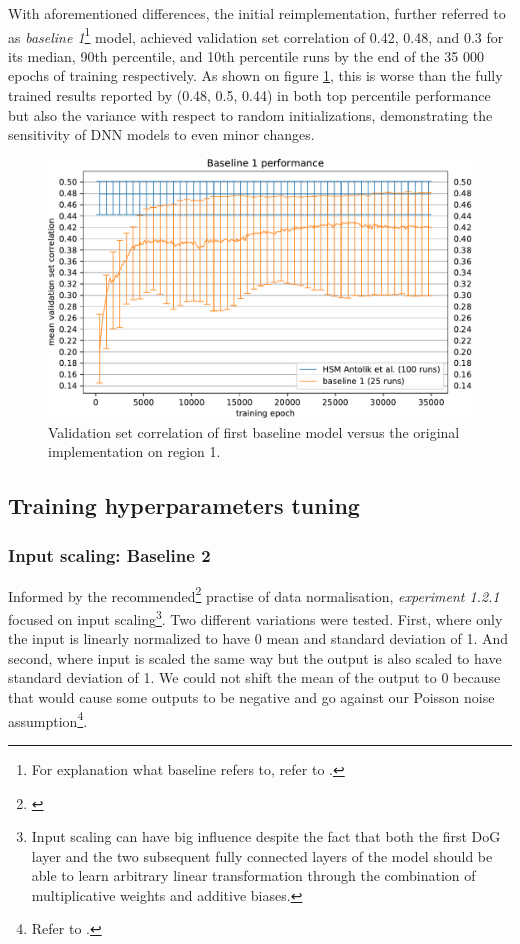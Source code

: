 With aforementioned differences, the initial reimplementation, further referred to as \emph{baseline 1}\footnote{For explanation what baseline refers to, refer to .} model, achieved validation set correlation of 0.42, 0.48, and 0.3 for its median, 90th percentile, and 10th percentile runs by the end of the 35 000 epochs of training respectively. As shown on figure \ref{fig:5.1.1.1}, this is worse than the fully trained results reported by \citeauthor{antolik} (0.48, 0.5, 0.44) in both top percentile performance but also the variance with respect to random initializations, demonstrating the sensitivity of DNN models to even minor changes.

\begin{figure}[H]
    \centering
    \includegraphics[width=1\textwidth]{../figures/05_1_1_1}
    \caption[Experiment 1.1.1]{Validation set correlation of first baseline model versus the original \cite{antolik} implementation on region 1\protect\footnotemark.}
    \label{fig:5.1.1.1}
\end{figure}

\subsection{Training hyperparameters tuning}
\subsubsection{Input scaling: Baseline 2}
Informed by the recommended\footnote{\citep{10.5555/645754.668382}} practise of data normalisation, \emph{experiment 1.2.1} focused on input scaling\footnote{Input scaling can have big influence despite the fact that both the first DoG layer and the two subsequent fully connected layers of the model should be able to learn arbitrary linear transformation through the combination of multiplicative weights and additive biases.}. Two different variations were tested. First, where only the input is linearly normalized to have 0 mean and standard deviation of 1. And second, where input is scaled the same way but the output is also scaled to have standard deviation of 1. We could not shift the mean of the output to 0 because that would cause some outputs to be negative and go against our Poisson noise assumption\footnote{Refer to .}.

